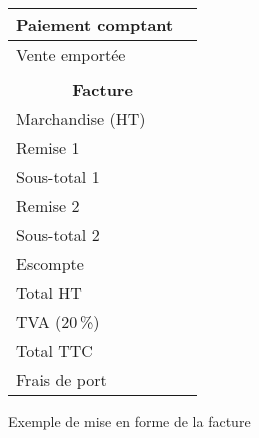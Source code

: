 \documentclass[a4paper, twoside, 11pt]{article}
\begin{document}
\begin{exercise}[Application]
\begin{center}
\begin{tabularx}{0.5\linewidth}{|l|X|}
      \hline
      Paiement comptant & \\
      \hline
      Vente emportée    & \\
      \hline
      \multicolumn{2}{c}{} \\
      \hline
      \multicolumn{2}{|c|}{\bfseries Facture} \\
      \hline\hline
      Marchandise (HT)  & \\
      \hline\hline
      Remise 1          & \\
      \hline
      Sous-total 1      & \\
      \hline
      Remise 2          & \\
      \hline
      Sous-total 2      & \\
      \hline\hline
      Escompte          & \\
      \hline
      Total HT          & \\
      \hline\hline
      TVA ($20$\,\%)    & \\
      \hline
      Total TTC         & \\
      \hline\hline
      Frais de port     & \\
      \hline
    \end{tabularx}
    \medskip
    
    Exemple de mise en forme de la facture
  \end{center}
\end{exercise}
\end{document}
